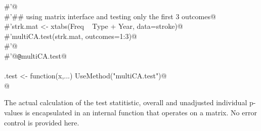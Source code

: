 \documentclass[reqno]{amsart}
\begin{document}
\begin{flushleft}
\begin{minipage}{\linewidth}
\begin{list}{}{}
\mbox{}\verb@#'@\\
\mbox{}\verb@#'## using matrix interface and testing only the first 3 outcomes@\\
\mbox{}\verb@#'strk.mat <- xtabs(Freq ~ Type + Year, data=stroke)@\\
\mbox{}\verb@#'multiCA.test(strk.mat, outcomes=1:3)@\\
\mbox{}\verb@#'@\\
\mbox{}\verb@#'@{\tt @}\verb@name multiCA.test@\\
\mbox{}\verb@@\\
\mbox{}\verb@multiCA.test <- function(x,...) UseMethod("multiCA.test")@\\
\mbox{}\verb@ @\\
\mbox{}\verb@@{\NWsep}
\end{list}
\vspace{-1.5ex}
\footnotesize
\begin{list}{}{\setlength{\itemsep}{-\parsep}\setlength{\itemindent}{-\leftmargin}}

\item{}
\end{list}
\end{minipage}\vspace{4ex}
\end{flushleft}
The actual calculation of the test statitistic, overall and unadjusted individual p-values is encapsulated in an internal function that operates on a matrix. No error control is provided here.
\end{document}
